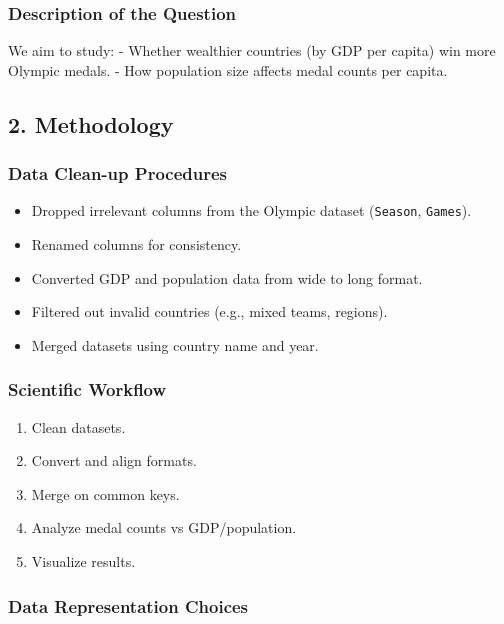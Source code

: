 \documentclass[
]{article}
\providecommand{\tightlist}{%
  \setlength{\itemsep}{0pt}\setlength{\parskip}{0pt}}
\begin{document}
\subsubsection{Description of the
Question}\label{description-of-the-question}

We aim to study: - Whether wealthier countries (by GDP per capita) win
more Olympic medals. - How population size affects medal counts per
capita.

\subsection{2. Methodology}\label{methodology}

\subsubsection{Data Clean-up Procedures}\label{data-clean-up-procedures}

\begin{itemize}
\tightlist
\item
  Dropped irrelevant columns from the Olympic dataset (\texttt{Season},
  \texttt{Games}).
\item
  Renamed columns for consistency.
\item
  Converted GDP and population data from wide to long format.
\item
  Filtered out invalid countries (e.g., mixed teams, regions).
\item
  Merged datasets using country name and year.
\end{itemize}

\subsubsection{Scientific Workflow}\label{scientific-workflow}

\begin{enumerate}
\def\labelenumi{\arabic{enumi}.}
\tightlist
\item
  Clean datasets.
\item
  Convert and align formats.
\item
  Merge on common keys.
\item
  Analyze medal counts vs GDP/population.
\item
  Visualize results.
\end{enumerate}

\subsubsection{Data Representation
Choices}\label{data-representation-choices}
\end{document}
